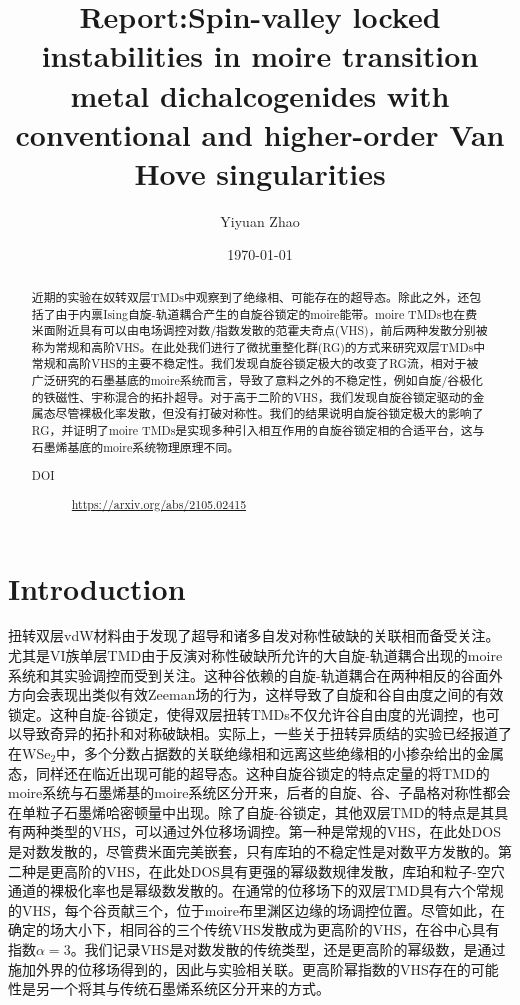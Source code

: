 \documentclass[reprint, aps, prb, showkeys]{revtex4-2}
\begin{document}
\title{Report:Spin-valley locked instabilities in moire transition metal dichalcogenides with \\
conventional and higher-order Van Hove singularities}

\author{Yiyuan Zhao}
\date{\today}

\begin{abstract}
近期的实验在奴转双层TMDs中观察到了绝缘相、可能存在的超导态。除此之外，还包括了由于内禀Ising自旋-轨道耦合产生的自旋谷锁定的moire能带。moire TMDs也在费米面附近具有可以由电场调控对数/指数发散的范霍夫奇点(VHS)，前后两种发散分别被称为常规和高阶VHS。在此处我们进行了微扰重整化群(RG)的方式来研究双层TMDs中常规和高阶VHS的主要不稳定性。我们发现自旋谷锁定极大的改变了RG流，相对于被广泛研究的石墨基底的moire系统而言，导致了意料之外的不稳定性，例如自旋/谷极化的铁磁性、宇称混合的拓扑超导。对于高于二阶的VHS，我们发现自旋谷锁定驱动的金属态尽管裸极化率发散，但没有打破对称性。我们的结果说明自旋谷锁定极大的影响了RG，并证明了moire TMDs是实现多种引入相互作用的自旋谷锁定相的合适平台，这与石墨烯基底的moire系统物理原理不同。
\begin{description}
    \item[DOI] \url{https://arxiv.org/abs/2105.02415}
\end{description}
\end{abstract}


\maketitle

\section{Introduction}
扭转双层vdW材料由于发现了超导和诸多自发对称性破缺的关联相而备受关注。尤其是VI族单层TMD由于反演对称性破缺所允许的大自旋-轨道耦合出现的moire系统和其实验调控而受到关注。这种谷依赖的自旋-轨道耦合在两种相反的谷面外方向会表现出类似有效Zeeman场的行为，这样导致了自旋和谷自由度之间的有效锁定。这种自旋-谷锁定，使得双层扭转TMDs不仅允许谷自由度的光调控，也可以导致奇异的拓扑和对称破缺相。实际上，一些关于扭转异质结的实验已经报道了在WSe$_2$中，多个分数占据数的关联绝缘相和远离这些绝缘相的小掺杂给出的金属态，同样还在临近出现可能的超导态。这种自旋谷锁定的特点定量的将TMD的moire系统与石墨烯基的moire系统区分开来，后者的自旋、谷、子晶格对称性都会在单粒子石墨烯哈密顿量中出现。除了自旋-谷锁定，其他双层TMD的特点是其具有两种类型的VHS，可以通过外位移场调控。第一种是常规的VHS，在此处DOS是对数发散的，尽管费米面完美嵌套，只有库珀的不稳定性是对数平方发散的。第二种是更高阶的VHS，在此处DOS具有更强的幂级数规律发散，库珀和粒子-空穴通道的裸极化率也是幂级数发散的。在通常的位移场下的双层TMD具有六个常规的VHS，每个谷贡献三个，位于moire布里渊区边缘的场调控位置。尽管如此，在确定的场大小下，相同谷的三个传统VHS发散成为更高阶的VHS，在谷中心具有指数$\alpha = 3$。我们记录VHS是对数发散的传统类型，还是更高阶的幂级数，是通过施加外界的位移场得到的，因此与实验相关联。更高阶幂指数的VHS存在的可能性是另一个将其与传统石墨烯系统区分开来的方式。
\end{document}
